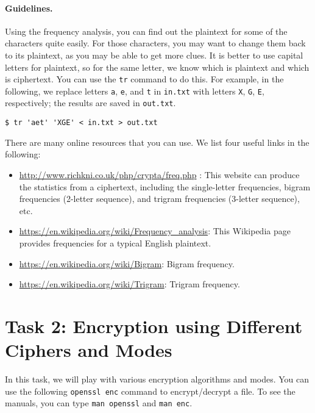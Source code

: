 \paragraph{Guidelines.} Using the frequency analysis, you can find
out the plaintext for some of the characters quite easily. For those characters, you may want
to change them back to its plaintext, as you may be able to get more clues.
It is better to use capital letters for plaintext, so for the same letter, we
know which is plaintext and which is ciphertext.
You can use the \texttt{tr} command to do this. For example, in the following,
we replace letters \texttt{a}, \texttt{e}, and \texttt{t} in
\texttt{in.txt} with letters \texttt{X}, \texttt{G}, \texttt{E}, respectively;
the results are saved in \texttt{out.txt}.


\begin{lstlisting}
$ tr 'aet' 'XGE' < in.txt > out.txt
\end{lstlisting}


There are many online resources that you can use. We list four useful links in
the following:


\begin{itemize}
\item \url{http://www.richkni.co.uk/php/crypta/freq.php} : This website can produce the
statistics from a ciphertext, including the single-letter frequencies, bigram
frequencies (2-letter sequence), and trigram frequencies (3-letter sequence), etc.

\item \url{https://en.wikipedia.org/wiki/Frequency_analysis}: This Wikipedia page
provides frequencies for a typical English plaintext.

\item \url{https://en.wikipedia.org/wiki/Bigram}: Bigram frequency.

\item  \url{https://en.wikipedia.org/wiki/Trigram}: Trigram frequency.
\end{itemize}




\section{Task 2: Encryption using Different Ciphers and Modes}

In this task, we will play with various encryption algorithms
and modes. You can use the following {\tt openssl enc}
command to encrypt/decrypt a file. To see the manuals, you can
type {\tt man openssl} and {\tt man enc}.

